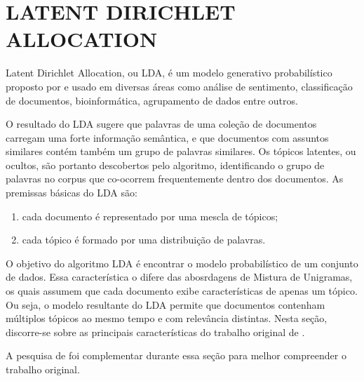 \documentclass[12pt,a4paper]{article}
\begin{document}
  

  
  
  \section{LATENT DIRICHLET ALLOCATION}
  Latent Dirichlet Allocation, ou LDA, é um modelo generativo probabilístico proposto por  e usado em diversas áreas como análise de sentimento,
   classificação de documentos, bioinformática, agrupamento de dados entre outros. 
   
   O resultado do LDA sugere que palavras de uma coleção de documentos carregam uma forte informação semântica,
   e que documentos com assuntos similares contém também um grupo de palavras similares. Os tópicos latentes, ou ocultos,
   são portanto descobertos pelo algoritmo, identificando o grupo de palavras no corpus que co-ocorrem frequentemente dentro dos documentos. As premissas  básicas do LDA são:
  
  \begin{enumerate}
    \item cada documento é representado por uma mescla de tópicos;
    \item cada tópico é formado por uma distribuição de palavras.
  \end{enumerate}
  
  O objetivo do algoritmo LDA é encontrar o modelo probabilístico de um conjunto de dados. Essa característica o difere das abosrdagens de Mistura de Unigramas, os quais assumem que cada documento exibe características de apenas um tópico. Ou seja, o modelo resultante do LDA  permite que documentos contenham múltiplos tópicos ao mesmo tempo e com relevância distintas. Nesta seção, discorre-se sobre as principais características do trabalho original de .
   
   A pesquisa de  foi complementar durante essa seção para melhor compreender o trabalho original.
  
\end{document}
